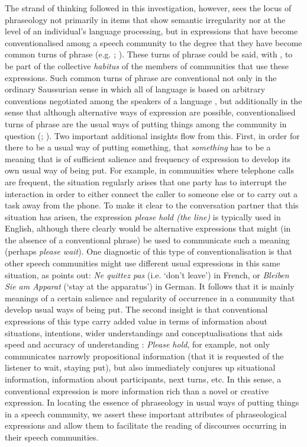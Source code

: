 \documentclass[output=paper]{langscibook}
\begin{document}
The strand of thinking followed in this investigation, however, sees the locus of phraseology not primarily in items that show semantic irregularity nor at the level of an individual’s language processing, but in expressions that have become conventionalised among a speech community to the degree that they have become common turns of phrase (e.g. \citealt[35]{Bybee2010}; \citealt[ch.~1]{Buerki2020}). These turns of phrase could be said, with \citet{Bourdieu1977}, to be part of the collective \textit{habitus} of the members of communities that use these expressions. Such common turns of phrase are conventional not only in the ordinary Saussurian sense in which all of language is based on arbitrary conventions negotiated among the speakers of a language \citep[65--70]{deSaussure1974}, but additionally in the sense that although alternative ways of expression are possible, conventionalised turns of phrase are the usual ways of putting things among the community in question (\citealt[30]{ErmanWarren2000}; \citealt{Buerki2020}). Two important additional insights flow from this. First, in order for there to be a usual way of putting something, that \textit{something} has to be a meaning that is of sufficient salience and frequency of expression to develop its own usual way of being put. For example, in communities where telephone calls are frequent, the situation regularly arises that one party has to interrupt the interaction in order to either connect the caller to someone else or to carry out a task away from the phone. To make it clear to the conversation partner that this situation has arisen, the expression \textit{please hold (the line)} is typically used in English, although there clearly would be alternative expressions that might (in the absence of a conventional phrase) be used to communicate such a meaning (perhaps \textit{please wait}). One diagnostic of this type of conventionalisation is that other speech communities might use different usual expressions in this same situation, as \citet[39]{Allerton1984} points out: \textit{Ne quittez pas} (i.e. `don’t leave') in French, or \textit{Bleiben Sie am Apparat} (`stay at the apparatus') in German. It follows that it is mainly meanings of a certain salience and regularity of occurrence in a community that develop usual ways of being put. The second insight is that conventional expressions of this type carry added value in terms of information about situations, intentions, wider understandings and conceptualisations that aids speed and accuracy of understanding \citep[238]{Feilke1994}: \textit{Please hold}, for example, not only communicates narrowly propositional information (that it is requested of the listener to wait, staying put), but also immediately conjures up situational information, information about participants, next turns, etc. In this sense, a conventional expression is more information rich than a novel or creative expression. In locating the essence of phraseology in usual ways of putting things in a speech community, we assert these important attributes of phraseological expressions and allow them to facilitate the reading of discourses occurring in their speech communities.
\end{document}
